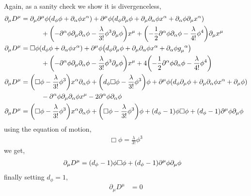 Again, as a sanity check we show it is divergenceless,
\begin{align}
    \partial_\mu D^\mu &=\partial_\mu \partial^\mu \phi\qty(d_\phi\phi +\partial_\alpha\phi x^\alpha)+\partial^\mu \phi\qty(d_\phi\partial_\mu \phi +\partial_\mu\partial_\alpha\phi x^\alpha+\partial_\alpha\phi\partial_\mu x^\alpha)\nonumber\\
    &\quad\quad\quad+\qty(-\partial^\alpha\phi\partial_\mu\partial_\alpha\phi-\frac{\lambda}{3!}\phi^3\partial_\mu\phi)x^\mu+\qty(-\frac12\partial^\alpha\phi\partial_\alpha\phi-\frac{\lambda}{4!}\phi^4)\partial_\mu x^\mu\\
    \partial_\mu D^\mu &=\Box\phi\qty(d_\phi\phi +\partial_\alpha\phi x^\alpha)+\partial^\mu \phi\qty(d_\phi\partial_\mu \phi +\partial_\mu\partial_\alpha\phi x^\alpha+\partial_\alpha\phi\tensor{g}{_\mu^\alpha})\nonumber\\
    &\quad\quad\quad+\qty(-\partial^\alpha\phi\partial_\mu\partial_\alpha\phi-\frac{\lambda}{3!}\phi^3\partial_\mu\phi)x^\mu+4\qty(-\frac12\partial^\alpha\phi\partial_\alpha\phi-\frac{\lambda}{4!}\phi^4)\\
    \partial_\mu D^\mu &=\qty(\Box\phi-\frac{\lambda}{3!}\phi^3)x^\alpha\partial_\alpha\phi+\qty(d_\phi\Box\phi-\frac{\lambda}{3!}\phi^3)\phi+\partial^\mu \phi\qty(d_\phi\partial_\mu \phi +\partial_\mu\partial_\alpha\phi x^\alpha+\partial_\mu\phi)\nonumber\\
    &\quad\quad\quad-\partial^\alpha\phi\partial_\mu\partial_\alpha\phi x^\mu-2\partial^\alpha\phi\partial_\alpha\phi\\
    \partial_\mu D^\mu &=\qty(\Box\phi-\frac{\lambda}{3!}\phi^3)x^\alpha\partial_\alpha\phi+\qty(\Box\phi-\frac{\lambda}{3!}\phi^3)\phi+\qty(d_\phi-1)\phi\Box\phi+\qty(d_\phi-1)\partial^\mu \phi\partial_\mu \phi
\end{align}
using the equation of motion, \begin{align}\Box\phi=\frac{\lambda}{3!}\phi^3\end{align}
we get,
\begin{align}
    \partial_\mu D^\mu &=\qty(d_\phi-1)\phi\Box\phi+\qty(d_\phi-1)\partial^\mu \phi\partial_\mu \phi
\end{align}
finally setting $d_\phi=1$, 
\begin{align}
    \partial_\mu D^\mu &=0
\end{align}

